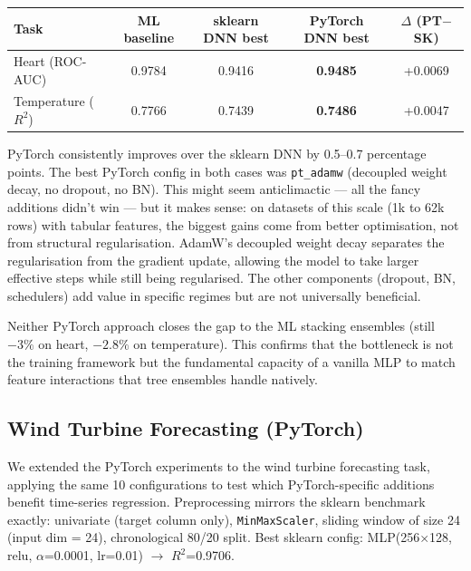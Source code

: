 \documentclass[11pt,a4paper]{article}
\begin{document}
\begin{center}
\small
\begin{tabular}{lcccc}
\toprule
\textbf{Task} & \textbf{ML baseline} & \textbf{sklearn DNN best} & \textbf{PyTorch DNN best} & \textbf{$\Delta$ (PT$-$SK)} \\
\midrule
Heart (ROC-AUC) & 0.9784 & 0.9416 & \textbf{0.9485} & +0.0069 \\
Temperature ($R^2$) & 0.7766 & 0.7439 & \textbf{0.7486} & +0.0047 \\
\bottomrule
\end{tabular}
\end{center}

PyTorch consistently improves over the sklearn DNN by 0.5--0.7 percentage points.
The best PyTorch config in both cases was \texttt{pt\_adamw} (decoupled weight decay, no dropout, no BN).
This might seem anticlimactic --- all the fancy additions didn't win --- but it makes sense: on datasets of this scale (1k to 62k rows) with tabular features, the biggest gains come from better optimisation, not from structural regularisation. AdamW's decoupled weight decay separates the regularisation from the gradient update, allowing the model to take larger effective steps while still being regularised. The other components (dropout, BN, schedulers) add value in specific regimes but are not universally beneficial.

Neither PyTorch approach closes the gap to the ML stacking ensembles (still $-3\%$ on heart, $-2.8\%$ on temperature). This confirms that the bottleneck is not the training framework but the fundamental capacity of a vanilla MLP to match feature interactions that tree ensembles handle natively.

\subsection{Wind Turbine Forecasting (PyTorch)}

We extended the PyTorch experiments to the wind turbine forecasting task, applying the same 10 configurations to test which PyTorch-specific additions benefit time-series regression.
Preprocessing mirrors the sklearn benchmark exactly: univariate (target column only), \texttt{MinMaxScaler}, sliding window of size 24 (input dim = 24), chronological 80/20 split.
Best sklearn config: MLP(256$\times$128, relu, $\alpha$=0.0001, lr=0.01) $\rightarrow$ $R^2$=0.9706.
\end{document}
